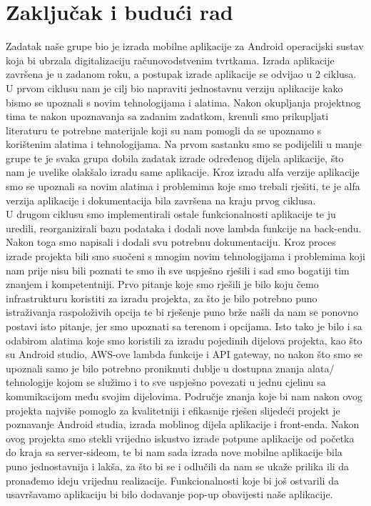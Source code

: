 \chapter{Zaključak i budući rad}
		
		
		
		 
		
		
		 
		 Zadatak naše grupe bio je izrada mobilne aplikacije za Android operacijski sustav koja bi ubrzala digitalizaciju računovodstvenim tvrtkama. Izrada aplikacije završena je u zadanom roku, a postupak izrade aplikacije se odvijao u 2 ciklusa.\\
		 \indent U prvom ciklusu nam je cilj bio napraviti jednostavnu verziju aplikacije kako bismo se upoznali s novim tehnologijama i alatima. Nakon okupljanja projektnog tima te nakon upoznavanja sa zadanim zadatkom, krenuli smo prikupljati literaturu te potrebne materijale koji su nam pomogli da se upoznamo s korištenim alatima i tehnologijama. Na prvom sastanku smo se podijelili u manje grupe te je svaka grupa dobila zadatak izrade određenog dijela aplikacije, što nam je uvelike olakšalo izradu same aplikacije. Kroz izradu alfa verzije aplikacije smo se upoznali sa novim alatima i problemima koje smo trebali rješiti, te je alfa verzija aplikacije i dokumentacija bila završena na kraju prvog ciklusa.\\
		 \indent U drugom ciklusu smo implementirali ostale funkcionalnosti aplikacije te ju uredili, reorganizirali bazu podataka i dodali nove lambda funkcije na back-endu. Nakon toga smo napisali i dodali svu potrebnu dokumentaciju.
		  \indent
		 Kroz proces izrade projekta bili smo suočeni s mnogim novim tehnologijama i problemima koji nam prije nisu bili poznati te smo ih sve uspješno rješili i sad smo bogatiji tim znanjem i kompetentniji.
		 Prvo pitanje koje smo rješili je bilo koju čemo infrastrukturu koristiti za izradu projekta, za što je bilo potrebno puno istraživanja raspoloživih opcija te bi rješenje puno brže našli da nam se ponovno postavi isto pitanje, jer smo upoznati sa terenom i opcijama. Isto tako je bilo i sa odabirom alatima koje smo koristili za izradu pojedinih dijelova projekta, kao što su Android studio, AWS-ove lambda funkcije i API gateway, no nakon što smo se upoznali samo je bilo potrebno proniknuti dublje u dostupna znanja alata/ tehnologije kojom se služimo i to sve uspješno povezati u jednu cjelinu sa komunikacijom među svojim dijelovima. Područje znanja koje bi nam nakon ovog projekta najviše pomoglo za kvalitetniji i efikasnije rješen slijedeći projekt je poznavanje Android studia, izrada moblinog dijela aplikacije i front-enda.
		 Nakon ovog projekta smo stekli vrijedno iskustvo izrade potpune aplikacije od početka do kraja sa server-sideom, te bi nam sada izrada nove mobilne aplikacije bila puno jednostavnija i lakša, za što bi se i odlučili da nam se ukaže prilika ili da pronađemo ideju vrijednu realizacije.
		  \indent
		 Funkcionalnosti koje bi još ostvarili da usavršavamo aplikaciju bi bilo dodavanje pop-up obavijesti naše aplikacije.
		 
		
		\eject 